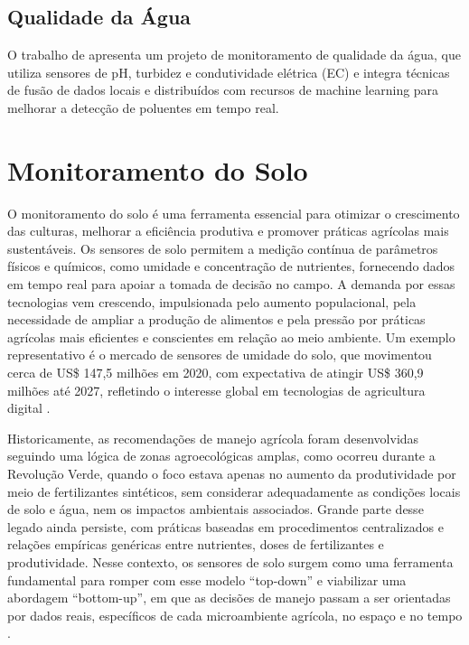 \subsection{Qualidade da Água}
O trabalho de \textcite{ferreira_2023_conception} apresenta um projeto de monitoramento de qualidade da água, que utiliza sensores de pH, turbidez e condutividade elétrica (EC) e integra técnicas de fusão de dados locais e distribuídos com recursos de machine learning para melhorar a detecção de poluentes em tempo real. 

\section{Monitoramento do Solo}

O monitoramento do solo é uma ferramenta essencial para otimizar o crescimento das culturas, melhorar a eficiência produtiva e promover práticas agrícolas mais sustentáveis. Os sensores de solo permitem a medição contínua de parâmetros físicos e químicos, como umidade e concentração de nutrientes, fornecendo dados em tempo real para apoiar a tomada de decisão no campo. A demanda por essas tecnologias vem crescendo, impulsionada pelo aumento populacional, pela necessidade de ampliar a produção de alimentos e pela pressão por práticas agrícolas mais eficientes e conscientes em relação ao meio ambiente. Um exemplo representativo é o mercado de sensores de umidade do solo, que movimentou cerca de US\$ 147{,}5 milhões em 2020, com expectativa de atingir US\$ 360{,}9 milhões até 2027, refletindo o interesse global em tecnologias de agricultura digital \cite{yin_2021_smart} .

Historicamente, as recomendações de manejo agrícola foram desenvolvidas seguindo uma lógica de zonas agroecológicas amplas, como ocorreu durante a Revolução Verde, quando o foco estava apenas no aumento da produtividade por meio de fertilizantes sintéticos, sem considerar adequadamente as condições locais de solo e água, nem os impactos ambientais associados. Grande parte desse legado ainda persiste, com práticas baseadas em procedimentos centralizados e relações empíricas genéricas entre nutrientes, doses de fertilizantes e produtividade. Nesse contexto, os sensores de solo surgem como uma ferramenta fundamental para romper com esse modelo “top-down” e viabilizar uma abordagem “bottom-up”, em que as decisões de manejo passam a ser orientadas por dados reais, específicos de cada microambiente agrícola, no espaço e no tempo \cite{viscarrarossel_2016_soil}.

